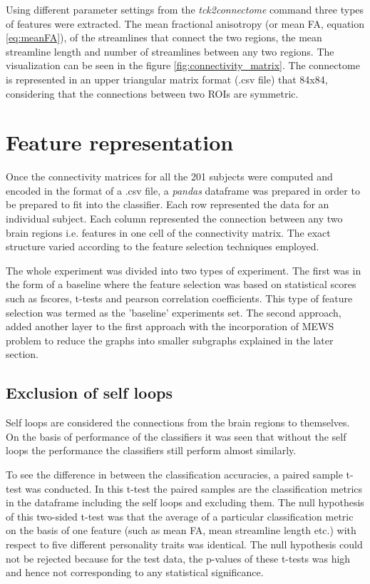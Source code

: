 \documentclass[msthesis.tex]{subfiles}
\begin{document}
Using different parameter settings from the \textit{tck2connectome} command three types of features  were extracted. The mean fractional anisotropy (or mean FA, equation \ref{eq:meanFA}), of the streamlines that connect the two regions, the mean streamline length and number of streamlines between any two regions. The visualization can be seen in the figure \ref{fig:connectivity_matrix}. The connectome is represented in an upper triangular matrix format (.csv file) that 84x84, considering that the connections between two ROIs are symmetric.

\section{Feature representation}
Once the connectivity matrices for all the 201 subjects were computed and encoded in the format of a .csv file, a \textit{pandas} dataframe was prepared in order to be prepared to fit into the classifier. Each row represented the data for an individual subject. Each column represented the connection between any two brain regions i.e. features in one cell of the connectivity matrix. The exact structure varied according to the feature selection techniques employed.

The whole experiment was divided into two types of experiment. The first was in the form of a baseline where the feature selection was based on statistical scores such as fscores, t-tests and pearson correlation coefficients. This type of feature selection was termed as the 'baseline' experiments set. The second approach, added another layer to the first approach with the incorporation of MEWS problem to reduce the graphs into smaller subgraphs explained in the later section.
\subsection{Exclusion of self loops}
Self loops are considered the connections from the brain regions to themselves. On the basis of performance of the classifiers it was seen that without the self loops the performance the classifiers still perform almost similarly.

To see the difference in between the classification accuracies, a paired sample t-test was conducted. In this t-test the paired samples are the classification metrics in the dataframe including the self loops and excluding them. The null hypothesis of this two-sided t-test was that the average of a particular classification metric on the basis of one feature (such as mean FA, mean streamline length etc.) with respect to five different personality traits was identical. The null hypothesis could not be rejected because for the test data, the p-values of these t-tests was high and hence not corresponding to any statistical significance. 

\end{document}
